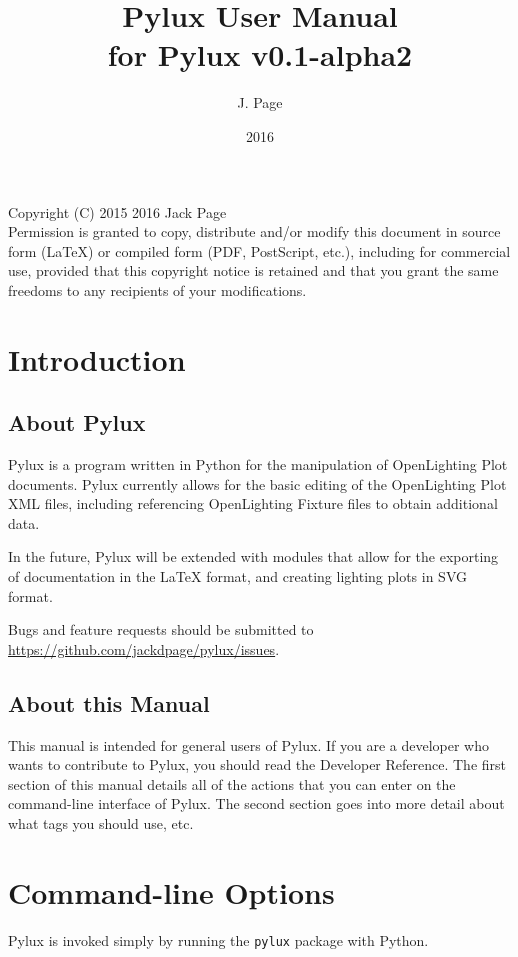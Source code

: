\documentclass[a4paper]{article}
\begin{document}
\title{Pylux User Manual \\ \large{for Pylux v0.1-alpha2}}
\author{J. Page}
\date{2016}
\maketitle
\vspace{1.0pt}
Copyright (C)  2015 2016 Jack Page \\
Permission is granted to copy, distribute and/or modify this document
in source form (LaTeX) or compiled form (PDF, PostScript, etc.), including 
for commercial use, provided that this copyright notice is retained and that 
you grant the same freedoms to any recipients of your modifications.
\tableofcontents
\newpage
\section{Introduction}
\subsection{About Pylux}
Pylux is a program written in Python for the manipulation of OpenLighting Plot
documents. Pylux currently allows for the basic editing of the OpenLighting
Plot XML files, including referencing OpenLighting Fixture files to obtain
additional data.

In the future, Pylux will be extended with modules that allow for the exporting
of documentation in the \LaTeX{} format, and creating lighting plots in SVG 
format.

Bugs and feature requests should be submitted to 
\url{https://github.com/jackdpage/pylux/issues}.

\subsection{About this Manual}
This manual is intended for general users of Pylux. If you are a developer 
who wants to contribute to Pylux, you should read the Developer Reference. 
The first section of this manual details all of the actions that you can enter 
on the command-line interface of Pylux. The second section goes into more 
detail about what tags you should use, etc.

\section{Command-line Options}
Pylux is invoked simply by running the \texttt{pylux} package with Python. 
\end{document}
